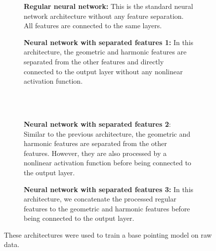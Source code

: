 \begin{figure}[H]
    \centering
    \begin{subfigure}[t]{0.49\textwidth}
        \centering
        
        \caption{\textbf{Regular neural network:}
        This is the standard neural network architecture without any feature separation.
        All features are connected to the same layers.}
        \label{subfig:cm_dt}
    \end{subfigure}
    \hfill
   \begin{subfigure}[t]{0.49\textwidth}
       \centering
       
       \caption{\textbf{Neural network with separated features 1:}
       In this architecture, the geometric and harmonic features are separated from the other features and directly connected to the output layer without any nonlinear activation function.}
       \label{subfig:cm_rf}
\end{subfigure}
\\~\\
    \begin{subfigure}[t]{0.49\textwidth}
        \centering
        
        \caption{\textbf{Neural network with separated features 2}:
        Similar to the previous architecture, the geometric and harmonic features are separated from the other features.
        However, they are also processed by a nonlinear activation function before being connected to the output layer.}
        \label{subfig:cm_bag}
    \end{subfigure}
    \hfill
       \begin{subfigure}[t]{0.49\textwidth}
        \centering
        
        \caption{\textbf{Neural network with separated features 3:}
        In this architecture, we concatenate the processed regular features to the geometric and harmonic features before being connected to the output layer.}
        \label{subfig:cm_bos}
    \end{subfigure}
     \caption{These architectures were used to train a base pointing model on raw data.}
     \label{fig:nn_architecture}
\end{figure}

